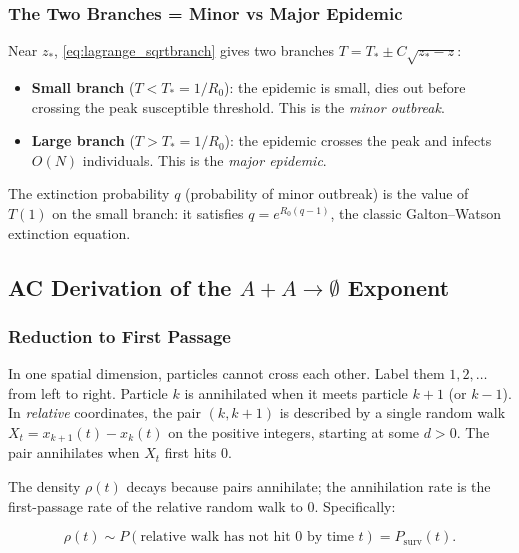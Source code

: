 \documentclass[11pt,a4paper]{article}
\theoremstyle{definition}
\begin{document}
\subsubsection{The Two Branches = Minor vs Major Epidemic}

Near $z_*$, \eqref{eq:lagrange_sqrtbranch} gives two branches $T = T_* \pm C\sqrt{z_* - z}$:

\begin{itemize}[leftmargin=2em]
  \item \textbf{Small branch} ($T < T_* = 1/R_0$): the epidemic is small, dies out
        before crossing the peak susceptible threshold. This is the \emph{minor outbreak}.
  \item \textbf{Large branch} ($T > T_* = 1/R_0$): the epidemic crosses the peak
        and infects $O(N)$ individuals. This is the \emph{major epidemic}.
\end{itemize}

The extinction probability $q$ (probability of minor outbreak) is the value of
$T(1)$ on the small branch: it satisfies $q = e^{R_0(q-1)}$, the classic
Galton--Watson extinction equation.

\subsection{AC Derivation of the $A+A\to\emptyset$ Exponent}

\subsubsection{Reduction to First Passage}

In one spatial dimension, particles cannot cross each other. Label them $1, 2, \ldots$
from left to right. Particle $k$ is annihilated when it meets particle $k+1$ (or $k-1$).
In \emph{relative} coordinates, the pair $(k, k+1)$ is described by a single
random walk $X_t = x_{k+1}(t) - x_k(t)$ on the positive integers, starting at
some $d > 0$. The pair annihilates when $X_t$ first hits 0.

The density $\rho(t)$ decays because pairs annihilate; the annihilation rate is
the first-passage rate of the relative random walk to 0. Specifically:

\begin{equation}
  \rho(t) \sim P(\text{relative walk has not hit 0 by time } t)
          = P_{\mathrm{surv}}(t).
  \label{eq:rho_surv}
\end{equation}
\end{document}
